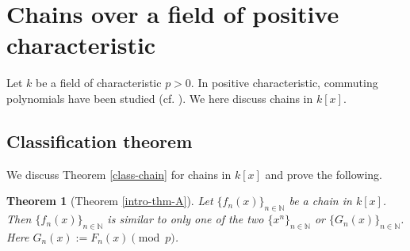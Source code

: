 \documentclass[a4paper, 11pt]{amsart}
\numberwithin{equation}{section}
\newtheorem{thm}{Theorem}[section]
\newtheorem{cor}[thm]{Corollary}
\theoremstyle{definition}
\newcommand{\N}{\mathbb{N}}
\newcommand{\Q}{\mathbb{Q}}
\begin{document}
%
%
%
%
%





\section{Chains over a field of positive characteristic}
Let $k$ be a field of characteristic $p>0$.
In positive characteristic, commuting polynomials have been studied (cf. \cite{Sch}). 
We here discuss chains in  $k[x]$.

\subsection{Classification theorem}
We discuss Theorem \ref{class-chain} for chains in $k[x]$ and prove the following.

\begin{thm}[Theorem \ref{intro-thm-A}]\label{thm-A}
Let $\{f_n(x)\}_{n \in \N}$ be a chain in $k[x]$.
Then $\{f_n(x)\}_{n \in \N}$ is similar to only one of the two $\{ x^n\}_{n\in\N}$ or $\{G_n(x)\}_{n\in\N}$.
Here $G_n(x):=F_n(x) \pmod p$.
\end{thm}
\end{document}
